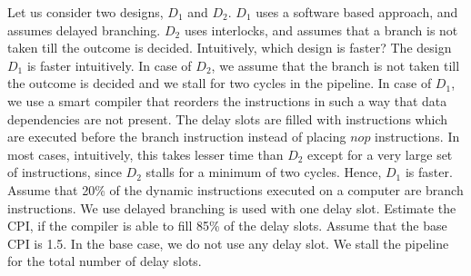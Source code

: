 \begin{ExerciseList}
\Exercise[difficulty=1]
Let us consider two designs, $D_1$ and $D_2$. $D_1$ uses a software based approach,
and assumes delayed branching. $D_2$ uses interlocks, and assumes that a branch is
not taken till the outcome is decided. 
Intuitively, which design is faster?
\Answer
The design $D_1$ is faster intuitively. In case of $D_2$, we assume that the branch is not taken till the outcome is decided and we stall for two cycles in the \simplerisc pipeline. In case of $D_1$, we use a smart compiler that reorders the instructions in such a way that data dependencies are not present. The delay slots are filled with instructions which are executed before the branch instruction instead of placing $nop$ instructions. In most cases, intuitively, this takes lesser time than $D_2$ except for a very large set of instructions, since $D_2$ stalls for a minimum of two cycles. Hence, $D_1$ is faster.   
\Exercise
Assume that 20\% of the dynamic instructions executed on a computer are branch
instructions. We use delayed branching is used with one delay slot. Estimate the CPI, if the compiler is
able to fill 85\% of the delay slots. Assume that the base CPI is 1.5. In the base case, we do not
use any delay slot. We stall the pipeline for the total number of delay slots.


\end{ExerciseList}
